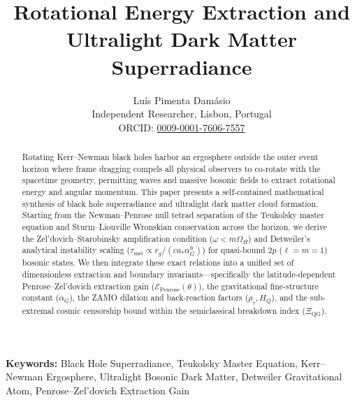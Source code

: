 \documentclass[11pt,a4paper]{article}
\title{\textbf{Rotational Energy Extraction and Ultralight Dark Matter Superradiance}}
\author{Lu\'{i}s {Pimenta Dam\'{a}sio}\\
\small Independent Researcher, Lisbon, Portugal\\
\small ORCID: \href{https://orcid.org/0009-0001-7606-7557}{0009-0001-7606-7557}}
\date{}
\begin{document}
\maketitle

\begin{abstract}
Rotating Kerr--Newman black holes harbor an ergosphere outside the outer event horizon where frame dragging compels all physical observers to co-rotate with the spacetime geometry, permitting waves and massive bosonic fields to extract rotational energy and angular momentum. This paper presents a self-contained mathematical synthesis of black hole superradiance and ultralight dark matter cloud formation. Starting from the Newman--Penrose null tetrad separation of the Teukolsky master equation and Sturm--Liouville Wronskian conservation across the horizon, we derive the Zel'dovich--Starobinsky amplification condition ($\omega < m\Omega_H$) and Detweiler's analytical instability scaling ($\tau_{\text{inst}} \propto r_g / (c a_* \alpha_G^9)$) for quasi-bound $2p$ ($\ell = m = 1$) bosonic states. We then integrate these exact relations into a unified set of dimensionless extraction and boundary invariants---specifically the latitude-dependent Penrose--Zel'dovich extraction gain ($\mathcal{E}_{\text{Penrose}}(\theta)$), the gravitational fine-structure constant ($\alpha_G$), the ZAMO dilation and back-reaction factors ($\rho_\tau, H_Q$), and the sub-extremal cosmic censorship bound within the semiclassical breakdown index ($\Xi_{\text{QG}}$).
\end{abstract}

\noindent\textbf{Keywords:} Black Hole Superradiance, Teukolsky Master Equation, Kerr--Newman Ergosphere, Ultralight Bosonic Dark Matter, Detweiler Gravitational Atom, Penrose--Zel'dovich Extraction Gain

\vspace{0.8em}
\noindent{}
\vspace{1em}
\end{document}
